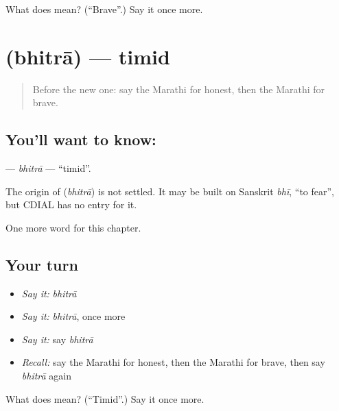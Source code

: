 \begin{tcolorbox}[breakable,colback=teal!4,colframe=teal!35!black,title={Before you move on}]
What does  mean? (\textquotedblleft{}Brave\textquotedblright{}.) Say it once more.
\end{tcolorbox}
\section[\texorpdfstring{\mr{भित्रा} (bhitrā)}{भित्रा (bhitrā)}]{ (bhitrā) — timid}

\label{lesson:MR-C151-bhitra}



\begin{quote}
Before the new one: say the Marathi for honest, then the Marathi for brave.
\end{quote}

\subsection*{You'll want to know: }
\textbf{} — \emph{bhitrā} — \textquotedblleft{}timid\textquotedblright{}.

\begin{cousinweb}
The origin of \textbf{} (\emph{bhitrā}) is not settled. It may be built on Sanskrit \emph{bhī}, \textquotedblleft{}to fear\textquotedblright{}, but CDIAL has no entry for it.
\end{cousinweb}

\begin{grammarlens}[title={What you've built}]
One more word for this chapter.
\end{grammarlens}

\subsection*{Your turn}
\begin{itemize}
\raggedright
  \item \emph{Say it:} \emph{bhitrā}
  \item \emph{Say it:} \emph{bhitrā}, once more
  \item \emph{Say it:} say \emph{bhitrā}
  \item \emph{Recall:} say the Marathi for honest, then the Marathi for brave, then say \emph{bhitrā} again
\end{itemize}

\begin{tcolorbox}[breakable,colback=teal!4,colframe=teal!35!black,title={Before you move on}]
What does  mean? (\textquotedblleft{}Timid\textquotedblright{}.) Say it once more.
\end{tcolorbox}
